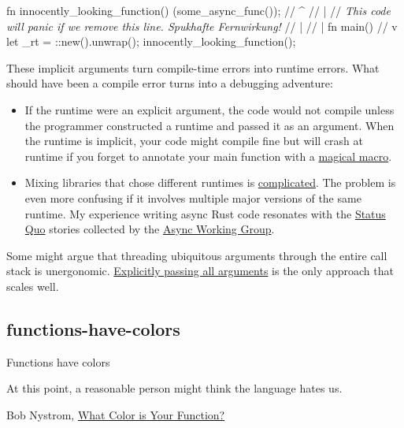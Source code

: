 \documentclass{article}
\begin{document}
\begin{code}[rust]
fn innocently_looking_function() {
  \href{https://docs.rs/tokio/1.25.0/tokio/fn.spawn.html}{}(some_async_func());
  // ^
  // |
  // \emph{This code will panic if we remove this line. Spukhafte Fernwirkung!}
} //                                     |
  //                                     |
fn main() { //                           v
  let _rt = \href{https://docs.rs/tokio/1.25.0/tokio/runtime/struct.Runtime.html}{}::new().unwrap();
  innocently_looking_function();
}
\end{code}

These implicit arguments turn compile-time errors into runtime errors.
What should have been a compile error turns into a debugging adventure:

\begin{itemize}
  \item
    If the runtime were an explicit argument, the code would not compile unless the programmer constructed a runtime and passed it as an argument.
    When the runtime is implicit, your code might compile fine but will crash at runtime if you forget to annotate your main function with a \href{https://docs.rs/tokio/latest/tokio/attr.main.html}{magical macro}.
  \item
    Mixing libraries that chose different runtimes is \href{https://www.ncameron.org/blog/portable-and-interoperable-async-rust/}{complicated}.
    The problem is even more confusing if it involves multiple major versions of the same runtime.
    My experience writing async Rust code resonates with the \href{https://rust-lang.github.io/wg-async/vision/submitted_stories/status_quo.html}{Status Quo} stories collected by the \href{https://rust-lang.github.io/wg-async/welcome.html}{Async Working Group}.
\end{itemize}

Some might argue that threading ubiquitous arguments through the entire call stack is unergonomic.
\href{/posts/03-rust-packages-crates-modules.html#explicit-dependencies}{Explicitly passing all arguments} is the only approach that scales well.

\subsection{functions-have-colors}{Functions have colors}
\epigraph{
    At this point, a reasonable person might think the language hates us.
}{Bob Nystrom, \href{https://journal.stuffwithstuff.com/2015/02/01/what-color-is-your-function/}{What Color is Your Function?}}
\end{document}
